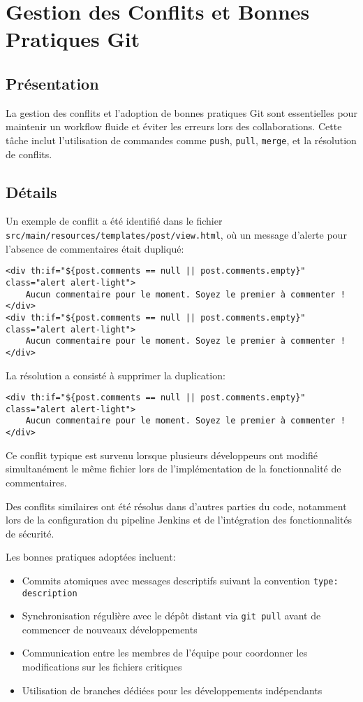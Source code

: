 \section{Gestion des Conflits et Bonnes Pratiques Git}
\subsection{Présentation}
La gestion des conflits et l'adoption de bonnes pratiques Git sont essentielles pour maintenir un workflow fluide et éviter les erreurs lors des collaborations. Cette tâche inclut l'utilisation de commandes comme \texttt{push}, \texttt{pull}, \texttt{merge}, et la résolution de conflits.

\subsection{Détails}
Un exemple de conflit a été identifié dans le fichier \texttt{src/main/resources/templates/post/view.html}, où un message d'alerte pour l'absence de commentaires était dupliqué:

\begin{verbatim}
<div th:if="${post.comments == null || post.comments.empty}" class="alert alert-light">
    Aucun commentaire pour le moment. Soyez le premier à commenter !
</div>
<div th:if="${post.comments == null || post.comments.empty}" class="alert alert-light">
    Aucun commentaire pour le moment. Soyez le premier à commenter !
</div>
\end{verbatim}

La résolution a consisté à supprimer la duplication:

\begin{verbatim}
<div th:if="${post.comments == null || post.comments.empty}" class="alert alert-light">
    Aucun commentaire pour le moment. Soyez le premier à commenter !
</div>
\end{verbatim}

Ce conflit typique est survenu lorsque plusieurs développeurs ont modifié simultanément le même fichier lors de l'implémentation de la fonctionnalité de commentaires.

Des conflits similaires ont été résolus dans d'autres parties du code, notamment lors de la configuration du pipeline Jenkins et de l'intégration des fonctionnalités de sécurité.

Les bonnes pratiques adoptées incluent:
\begin{itemize}
  \item Commits atomiques avec messages descriptifs suivant la convention \texttt{type: description}
  \item Synchronisation régulière avec le dépôt distant via \texttt{git pull} avant de commencer de nouveaux développements
  \item Communication entre les membres de l'équipe pour coordonner les modifications sur les fichiers critiques
  \item Utilisation de branches dédiées pour les développements indépendants
\end{itemize}

